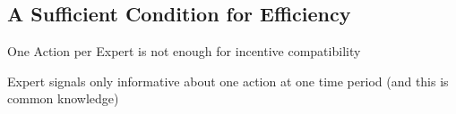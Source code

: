 





 \subsection{A Sufficient Condition for Efficiency}

 \begin{lem}
 One Action per Expert is not enough for incentive compatibility
 \end{lem}



 \begin{lem}
 Expert signals only informative about one action at one time period (and this is common knowledge) 
 \end{lem}


